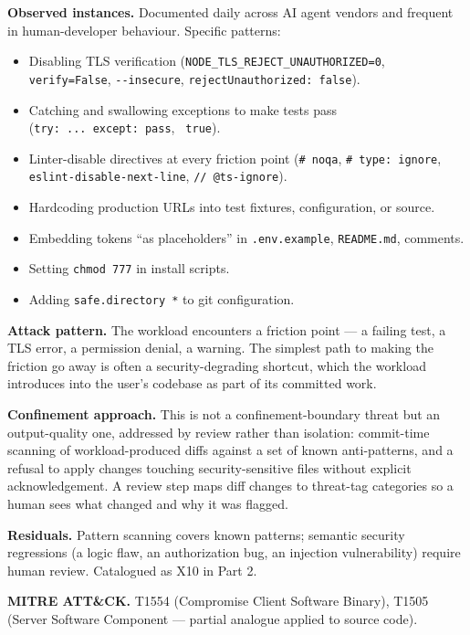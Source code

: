 \textbf{Observed instances.} Documented daily across AI agent vendors
and frequent in human-developer behaviour. Specific patterns:

\begin{itemize}
\tightlist
\item
  Disabling TLS verification
  (\texttt{NODE\_TLS\_REJECT\_UNAUTHORIZED=0}, \texttt{verify=False},
  \texttt{-\/-insecure}, \texttt{rejectUnauthorized:\ false}).
\item
  Catching and swallowing exceptions to make tests pass
  (\texttt{try:\ ...\ except:\ pass},
  \texttt{\textbar{}\textbar{}\ true}).
\item
  Linter-disable directives at every friction point (\texttt{\#\ noqa},
  \texttt{\#\ type:\ ignore}, \texttt{eslint-disable-next-line},
  \texttt{//\ @ts-ignore}).
\item
  Hardcoding production URLs into test fixtures, configuration, or
  source.
\item
  Embedding tokens ``as placeholders'' in \texttt{.env.example},
  \texttt{README.md}, comments.
\item
  Setting \texttt{chmod\ 777} in install scripts.
\item
  Adding \texttt{safe.directory\ \textquotesingle{}*\textquotesingle{}}
  to git configuration.
\end{itemize}

\textbf{Attack pattern.} The workload encounters a friction point --- a
failing test, a TLS error, a permission denial, a warning. The simplest
path to making the friction go away is often a security-degrading
shortcut, which the workload introduces into the user's codebase as part
of its committed work.

\textbf{Confinement approach.} This is not a confinement-boundary threat
but an output-quality one, addressed by review rather than isolation:
commit-time scanning of workload-produced diffs against a set of known
anti-patterns, and a refusal to apply changes touching
security-sensitive files without explicit acknowledgement. A review step
maps diff changes to threat-tag categories so a human sees what changed
and why it was flagged.

\textbf{Residuals.} Pattern scanning covers known patterns; semantic
security regressions (a logic flaw, an authorization bug, an injection
vulnerability) require human review. Catalogued as X10 in Part 2.

\textbf{MITRE ATT\&CK.} T1554 (Compromise Client Software Binary), T1505
(Server Software Component --- partial analogue applied to source code).

